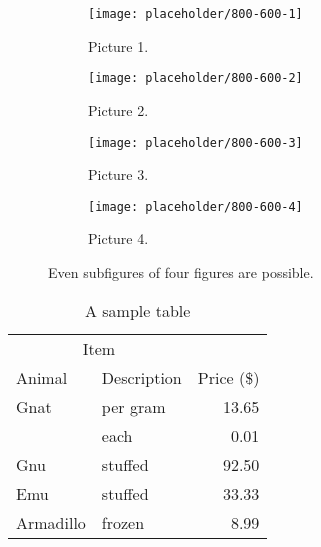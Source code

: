 \begin{figure}
    \centering
    \begin{subfigure}[b]{0.49\textwidth}
        \texttt{[image: placeholder/800-600-1]}
        \caption{Picture 1.}
        \label{fig:subfigures-four:1}
    \end{subfigure}
    \hfill
    \begin{subfigure}[b]{0.49\textwidth}
        \texttt{[image: placeholder/800-600-2]}
        \caption{Picture 2.}
        \label{fig:subfigures-four:2}
    \end{subfigure}
    \hfill
    \begin{subfigure}[b]{0.49\textwidth}
        \texttt{[image: placeholder/800-600-3]}
        \caption{Picture 3.}
        \label{fig:subfigures-four:3}
    \end{subfigure}
    \hfill
    \begin{subfigure}[b]{0.49\textwidth}
        \texttt{[image: placeholder/800-600-4]}
        \caption{Picture 4.}
        \label{fig:subfigures-four:4}
    \end{subfigure}
    
    \caption{Even subfigures of four figures are possible.}
    \label{fig:subfigures-four}
\end{figure}

\begin{table}
    \centering
    \caption{A sample table}
    \label{tbl:sample-table}
    \begin{tabular}{@{}llr@{}} \toprule
        \multicolumn{2}{c}{Item} \\ \cmidrule(r){1-2}
        Animal & Description & Price (\$)\\ \midrule
        Gnat  & per gram  & 13.65 \\
        & each      & 0.01 \\
        Gnu   & stuffed   & 92.50 \\
        Emu   & stuffed   & 33.33 \\
        Armadillo & frozen & 8.99 \\ \bottomrule
    \end{tabular}
\end{table}

